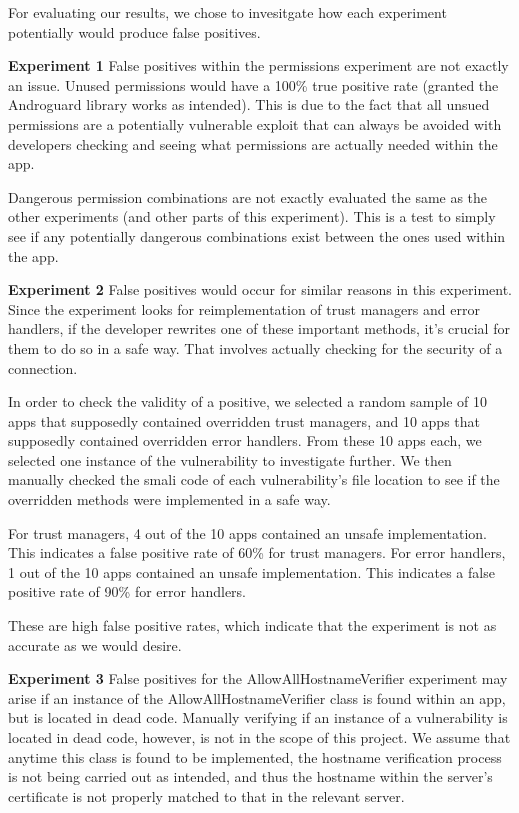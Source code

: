 For evaluating our results, we chose to invesitgate how each experiment potentially would produce false positives.

\textbf{Experiment 1}
False positives within the permissions experiment are not exactly an issue. Unused permissions would have a 100\% true positive rate (granted the Androguard library works as intended). 
This is due to the fact that all unsued permissions are a potentially vulnerable exploit that can always be avoided with developers checking and seeing what permissions are actually needed within the app. 

Dangerous permission combinations are not exactly evaluated the same as the other experiments (and other parts of this experiment). This is a test to simply see if any potentially dangerous combinations exist between 
the ones used within the app. 

\textbf{Experiment 2}
False positives would occur for similar reasons in this experiment. 
Since the experiment looks for reimplementation of trust managers and error handlers,
if the developer rewrites one of these important methods, 
it's crucial for them to do so in a safe way. 
That involves actually checking for the security of a connection.

In order to check the validity of a positive, we selected a random
sample of 10 apps that supposedly contained overridden trust managers,
and 10 apps that supposedly contained overridden error handlers.
From these 10 apps each, we selected one instance of the vulnerability
to investigate further.
We then manually checked the smali code of each vulnerability's file location
 to see if the
overridden methods were implemented in a safe way.

For trust managers, 4 out of the 10 apps contained an unsafe implementation.
This indicates a false positive rate of 60\% for trust managers.
For error handlers, 1 out of the 10 apps contained an unsafe implementation.
This indicates a false positive rate of 90\% for error handlers.

These are high false positive rates, which indicate that the experiment
is not as accurate as we would desire.


\textbf{Experiment 3}
False positives for the AllowAllHostnameVerifier experiment may arise if an instance of the AllowAllHostnameVerifier 
class is found within an app, but is located in dead code. Manually verifying if an instance of a vulnerability is located 
in dead code, however, is not in the scope of this project. We assume that anytime this class is found to be implemented, the hostname verification process is not being carried out as intended, and thus the 
hostname within the server's certificate is not properly matched to that in the relevant server. 

